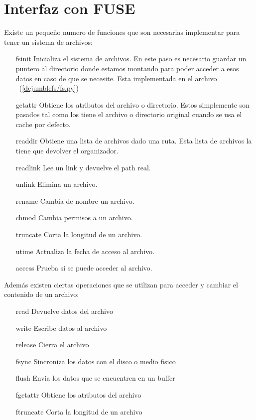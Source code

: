\section{Interfaz con FUSE}

Existe un pequeño numero de funciones que son necesarias implementar para tener un sistema de archivos:

\begin{itemize}
\item[fsinit] Inicializa el sistema de archivos. En este paso es necesario guardar un puntero al directorio donde estamos montando para poder acceder a esos datos en caso de que se necesite. Esta implementada en el archivo ~(\ref{dejumblefs/fs.py})
\item[getattr] Obtiene los atributos del archivo o directorio. Estos simplemente son pasados tal como los tiene el archivo o directorio original cuando se usa el cache por defecto.
\item[readdir] Obtiene una lista de archivos dado una ruta. Esta lista de archivos la tiene que devolver el organizador.
\item[readlink] Lee un link	y devuelve el path real.
\item[unlink] Elimina un archivo.
\item[rename] Cambia de nombre un archivo.
\item[chmod] Cambia permisos a un archivo.
\item[truncate] Corta la longitud de un archivo.
\item[utime] Actualiza la fecha de acceso al archivo.
\item[access] Prueba si se puede acceder al archivo.
\end{itemize}

Además existen ciertas operaciones que se utilizan para acceder y cambiar el contenido de un archivo:

\begin{itemize}
\item[read] Devuelve datos del archivo
\item[write] Escribe datos al archivo
\item[release] Cierra el archivo
\item[fsync] Sincroniza los datos con el disco o medio fisico
\item[flush] Envia los datos que se encuentren en un buffer
\item[fgetattr] Obtiene los atributos del archivo
\item[ftruncate] Corta la longitud de un archivo
\end{itemize}



